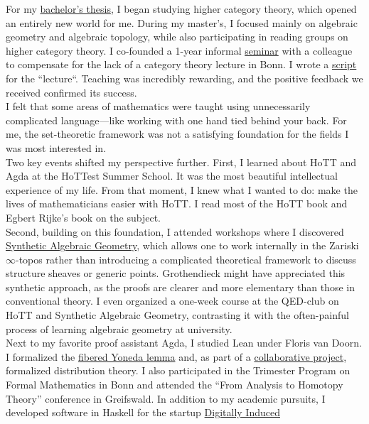 \documentclass[12pt,headings=small,paper=A4,DIV=calc]{article}
\begin{document}
For my \href{https://uni-bonn.sciebo.de/s/PJUqHE52SnCKJMy}{bachelor's thesis}, I began studying higher category theory, which opened an entirely new world for me. During my master's, I focused mainly on algebraic geometry and algebraic topology, while also participating in reading groups on higher category theory. I co-founded a 1-year informal \href{https://uni-bonn.sciebo.de/s/eEHziabNePFwvb4}{seminar} with a colleague to compensate for the lack of a category theory lecture in Bonn. I wrote a \href{https://uni-bonn.sciebo.de/s/RzjF14df9WvD3O5}{script} for the ``lecture``. Teaching was incredibly rewarding, and the positive feedback we received confirmed its success. \\
I felt that some areas of mathematics were taught using unnecessarily complicated language---like working with one hand tied behind your back. For me, the set-theoretic framework was not a satisfying foundation for the fields I was most interested in. \\
Two key events shifted my perspective further. First, I learned about HoTT and Agda at the HoTTest Summer School. It was the most beautiful intellectual experience of my life. From that moment, I knew what I wanted to do: make the lives of mathematicians easier with HoTT. I read most of the HoTT book and Egbert Rijke's book on the subject. \\
Second, building on this foundation, I attended workshops where I discovered \href{https://github.com/felixwellen/synthetic-zariski}{Synthetic Algebraic Geometry}, which allows one to work internally in the Zariski $\infty$-topos rather than introducing a complicated theoretical framework to discuss structure sheaves or generic points. Grothendieck might have appreciated this synthetic approach, as the proofs are clearer and more elementary than those in conventional theory. I even organized a one-week course at the QED-club on HoTT and Synthetic Algebraic Geometry, contrasting it with the often-painful process of learning algebraic geometry at university. \\

Next to my favorite proof assistant Agda, I studied Lean under Floris van Doorn. I formalized the \href{https://github.com/timlichtnau/LeanCourse23/tree/master/LeanCourse/Project}{fibered Yoneda lemma} and, as part of a \href{https://github.com/timlichtnau/BonnAnalysis/tree/master/BonnAnalysis}{collaborative project}, formalized distribution theory. I also participated in the Trimester Program on Formal Mathematics in Bonn and attended the ``From Analysis to Homotopy Theory'' conference in Greifswald. In addition to my academic pursuits, I developed software in Haskell for the startup \href{https://www.digitallyinduced.com/}{Digitally Induced} \\
\end{document}
